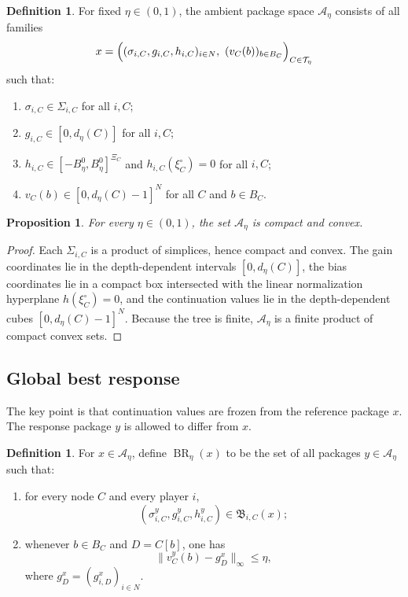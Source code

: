 \documentclass[12pt]{article}
\newtheorem{proposition}[theorem]{Proposition}
\theoremstyle{definition}
\newtheorem{definition}[theorem]{Definition}
\newcommand{\1}{\mathbf{1}}
\newcommand{\cA}{\mathcal{A}}
\newcommand{\cT}{\mathcal{T}}
\DeclareMathOperator{\BR}{BR}
\begin{document}
\begin{definition}
\label{def:Aeta}
For fixed $\eta\in(0,1)$, the ambient package space $\cA_\eta$ consists of all
families
\[
x=\Bigl((\sigma_{i,C},g_{i,C},h_{i,C})_{i\in N},\ (v_C(b))_{b\in B_C}\Bigr)_{C\in\cT_\eta}
\]
such that:
\begin{enumerate}[label=\textnormal{(A\arabic*)},leftmargin=2.8em]
\item $\sigma_{i,C}\in \Sigma_{i,C}$ for all $i,C$;
\item $g_{i,C}\in[0,d_\eta(C)]$ for all $i,C$;
\item $h_{i,C}\in[-B_\eta^0,B_\eta^0]^{\Xi_C}$ and
$h_{i,C}(\xi_C^\circ)=0$ for all $i,C$;
\item $v_C(b)\in[0,d_\eta(C)-1]^N$ for all $C$ and $b\in B_C$.
\end{enumerate}
\end{definition}

\begin{proposition}
\label{prop:Aeta-compact}
For every $\eta\in(0,1)$, the set $\cA_\eta$ is compact and convex.
\end{proposition}

\begin{proof}
Each $\Sigma_{i,C}$ is a product of simplices, hence compact and convex. The gain
coordinates lie in the depth-dependent intervals $[0,d_\eta(C)]$, the bias
coordinates lie in a compact box intersected with the linear normalization
hyperplane $h(\xi_C^\circ)=0$, and the continuation values lie in the
depth-dependent cubes $[0,d_\eta(C)-1]^N$. Because the tree is finite,
$\cA_\eta$ is a finite product of compact convex sets.
\end{proof}

\subsection{Global best response}

The key point is that continuation values are frozen from the reference package
$x$. The response package $y$ is allowed to differ from $x$.

\begin{definition}
\label{def:global-BR}
For $x\in\cA_\eta$, define $\BR_\eta(x)$ to be the set of all packages
$y\in\cA_\eta$ such that:
\begin{enumerate}[label=\textnormal{(G\arabic*)},leftmargin=2.8em]
\item for every node $C$ and every player $i$,
\[
(\sigma_{i,C}^y,g_{i,C}^y,h_{i,C}^y)\in \mathfrak B_{i,C}(x);
\]
\item whenever $b\in B_C$ and $D=C[b]$, one has
\begin{equation}
\label{eq:frozen-continuation}
\|v_C^y(b)-g_D^x\|_\infty\le \eta,
\end{equation}
where $g_D^x=(g_{i,D}^x)_{i\in N}$.
\end{enumerate}
\end{definition}
\end{document}
